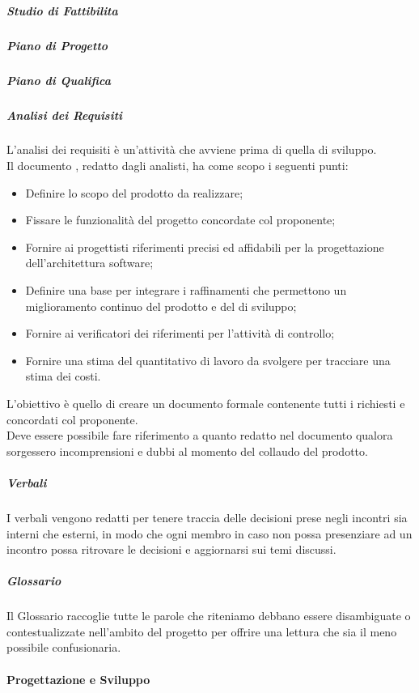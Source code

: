 \subparagraph*{Studio di Fattibilita}

\subparagraph*{Piano di Progetto}

\subparagraph*{Piano di Qualifica}


\subparagraph*{Analisi dei Requisiti}

L'analisi dei requisiti è un'attività che avviene prima di quella di sviluppo.\\
Il documento \AdR{}, redatto dagli analisti, ha come scopo i seguenti punti:
\begin{itemize}
\item Definire lo scopo del prodotto da realizzare;
\item Fissare le funzionalità del progetto concordate col proponente;
\item Fornire ai progettisti riferimenti precisi ed affidabili per la progettazione dell'architettura software;
\item Definire una base per integrare i raffinamenti che permettono un miglioramento continuo del prodotto e del  di sviluppo;
\item Fornire ai verificatori dei riferimenti per l’attività di controllo;
\item Fornire una stima del quantitativo di lavoro da svolgere per tracciare una stima dei costi. 
\end{itemize}

L'obiettivo è quello di creare un documento formale contenente tutti i  richiesti e concordati col proponente.\\
Deve essere possibile fare riferimento a quanto redatto nel documento \AdR{} qualora sorgessero incomprensioni e dubbi al momento del collaudo del prodotto.

\subparagraph*{Verbali}

I verbali vengono redatti per tenere traccia delle decisioni prese negli incontri sia interni che esterni, in modo che ogni membro in caso non possa presenziare ad un incontro possa ritrovare le decisioni e aggiornarsi sui temi discussi.

\subparagraph*{Glossario}

Il Glossario raccoglie tutte le parole che riteniamo debbano essere disambiguate o contestualizzate nell'ambito del progetto per offrire una lettura che sia il meno possibile confusionaria.

\paragraph*{Progettazione e Sviluppo}

